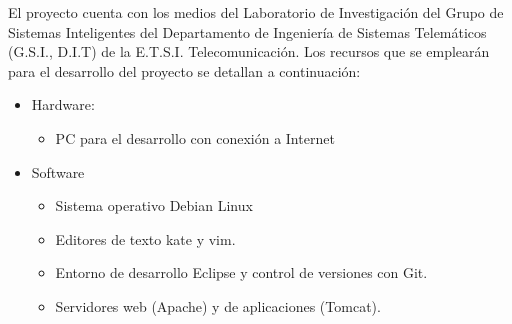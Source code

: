 \documentclass[a4paper,11pt]{report}
\begin{document}
El proyecto cuenta con los medios del Laboratorio de Investigación del Grupo de
Sistemas Inteligentes del Departamento de Ingeniería de Sistemas Telemáticos (G.S.I.,
D.I.T) de la E.T.S.I. Telecomunicación. Los recursos que se emplearán para el desarrollo
del proyecto se detallan a continuación:
\begin{itemize}
  \item Hardware:
  \begin{itemize}
    \item PC para el desarrollo con conexión a Internet
  \end{itemize}
  \item Software
  \begin{itemize}
    \item Sistema operativo Debian Linux
    \item Editores de texto kate y vim.
    \item Entorno de desarrollo Eclipse y control de versiones con Git.
    \item Servidores web (Apache) y de aplicaciones (Tomcat).
  \end{itemize}
\end{itemize}

\nocite{*}
 
{
\let\clearpage\relax
\small

}
\end{document}
